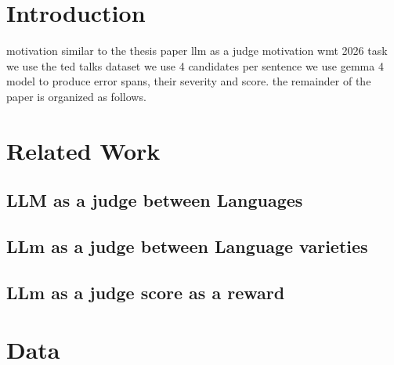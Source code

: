 \documentclass[acmtog]{acmart}
\begin{document}



\maketitle

\section{Introduction}
motivation similar to the thesis paper
llm as a judge motivation
wmt 2026 task
we use the ted talks dataset
we use 4 candidates per sentence
we use gemma 4 model to produce error spans, their severity and score.
the remainder of the paper is organized as follows.

\section{Related Work}
\label{sec:related_work}

\subsection{LLM as a judge between Languages}

\subsection{LLm as a judge between Language varieties}

\subsection{LLm as a judge score as a reward}

\section{Data}
\label{sec:data}
\end{document}
